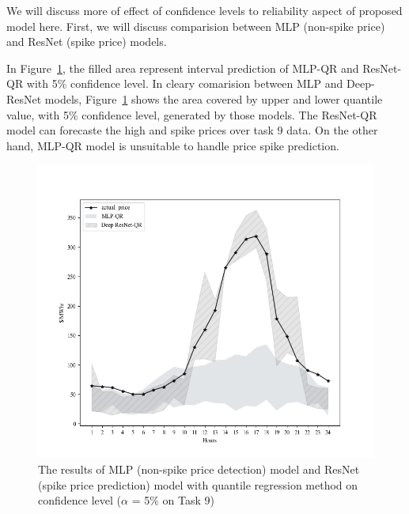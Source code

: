 \documentclass[review]{elsarticle}
\begin{document}
    We will discuss more of effect of confidence levels to reliability aspect of proposed model here. First, we will discuss comparision between MLP (non-spike price) and ResNet (spike price) models.

    In Figure~\ref{Fig:compare_spike_and_non_spike_model}, the filled area represent interval prediction of MLP-QR and ResNet-QR with 5$\%$ confidence level.
    In cleary comarision between MLP and Deep-ResNet models, Figure~\ref{Fig:compare_spike_and_non_spike_model} shows the area covered by upper and lower quantile value, with 5$\%$ confidence level, generated by those models.
    The ResNet-QR model can forecaste the high and spike prices over task 9 data. On the other hand, MLP-QR model is unsuitable to handle price spike prediction.
    \begin{figure}[H]
      \centering
      \includegraphics[width=12cm]{Task_9-compare_between_non-spike_and_spike}
      \caption{The results of MLP (non-spike price detection) model and ResNet (spike price prediction) model with quantile regression method on confidence level ($\alpha$ = 5$\%$ on Task 9)}
      \label{Fig:compare_spike_and_non_spike_model}
    \end{figure}
\end{document}
